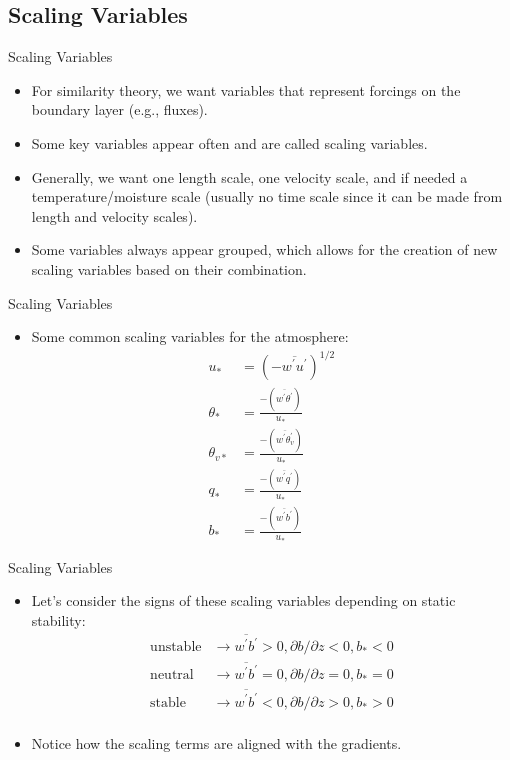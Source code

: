 \subsection{Scaling Variables}
\begin{frame}{Scaling Variables}
\begin{itemize}
	\item For similarity theory, we want variables that represent forcings on the boundary layer (e.g., fluxes).
	\item Some key variables appear often and are called scaling variables.
	\item Generally, we want one length scale, one velocity scale, and if needed a temperature/moisture scale (usually no time scale since it can be made from length and velocity scales).
	\item Some variables always appear grouped, which allows for the creation of new scaling variables based on their combination.
	\end{itemize}
\end{frame}
\begin{frame}{Scaling Variables}
\begin{itemize}
	\item Some common scaling variables for the atmosphere:
	\begin{align*}
	u_* &= (-\overline{w^\prime u^\prime})^{1/2} \\
	\theta_* &= \frac{-(\overline{w^\prime \theta^\prime})}{u_*}\\
	\theta_{v*} &= \frac{-(\overline{w^\prime \theta_v^\prime})}{u_*}\\
	q_* &= \frac{-(\overline{w^\prime q^\prime})}{u_*}\\
	b_* &= \frac{-(\overline{w^\prime b^\prime})}{u_*}
	\end{align*}
	\end{itemize}
\end{frame}
\begin{frame}{Scaling Variables}
\begin{itemize}
	\item Let's consider the signs of these scaling variables depending on static stability:
	\begin{align*}
	\text{unstable} &\rightarrow \overline{w^\prime b^\prime} > 0, \partial b/\partial z < 0, b_* < 0\\
	\text{neutral} &\rightarrow \overline{w^\prime b^\prime} = 0, \partial b/\partial z = 0, b_* = 0\\
	\text{stable} &\rightarrow \overline{w^\prime b^\prime} < 0, \partial b/\partial z > 0, b_* > 0\\
	\end{align*}
	\item Notice how the scaling terms are aligned with the gradients.
	\end{itemize}
\end{frame}
